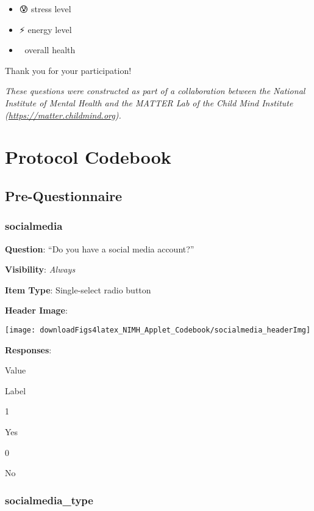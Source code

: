 \documentclass[]{book}
\providecommand{\tightlist}{%
  \setlength{\itemsep}{0pt}\setlength{\parskip}{0pt}}
\begin{document}
\begin{itemize}
\tightlist
\item
  😰 stress level
\item
  ⚡️ energy level
\item
  🏥 overall health
\end{itemize}

Thank you for your participation!

\emph{These questions were constructed as part of a collaboration between the National Institute of Mental Health and the MATTER Lab of the Child Mind Institute (\url{https://matter.childmind.org}).}

\hypertarget{part-protocol-codebook}{%
\part{Protocol Codebook}\label{part-protocol-codebook}}

\hypertarget{pre_section}{%
\chapter{Pre-Questionnaire}\label{pre_section}}

\hypertarget{socialmedia}{%
\section{socialmedia}\label{socialmedia}}

\textbf{Question}: ``Do you have a social media account?''

\textbf{Visibility}: \emph{Always}

\textbf{Item Type}: Single-select radio button

\textbf{Header Image}:

\begin{flushleft}\texttt{[image: downloadFigs4latex\_NIMH\_Applet\_Codebook/socialmedia\_headerImg]} \end{flushleft}

\textbf{Responses}:

Value

Label

1

Yes

0

No

\hypertarget{socialmedia_type}{%
\section{socialmedia\_type}\label{socialmedia_type}}
\end{document}
